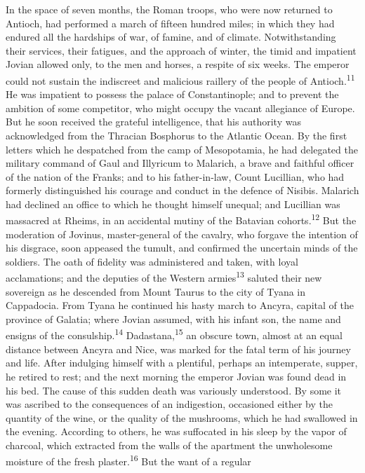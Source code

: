 {{{{{{{{{{In the space of seven months, the Roman troops, who were now
returned to Antioch, had performed a march of fifteen hundred
miles; in which they had endured all the hardships of war, of
famine, and of climate. Notwithstanding their services, their
fatigues, and the approach of winter, the timid and impatient
Jovian allowed only, to the men and horses, a respite of six
weeks. The emperor could not sustain the indiscreet and malicious
raillery of the people of Antioch.\textsuperscript{11} He was impatient to possess
the palace of Constantinople; and to prevent the ambition of some
competitor, who might occupy the vacant allegiance of Europe. But
he soon received the grateful intelligence, that his authority
was acknowledged from the Thracian Bosphorus to the Atlantic
Ocean. By the first letters which he despatched from the camp of
Mesopotamia, he had delegated the military command of Gaul and
Illyricum to Malarich, a brave and faithful officer of the nation
of the Franks; and to his father-in-law, Count Lucillian, who had
formerly distinguished his courage and conduct in the defence of
Nisibis. Malarich had declined an office to which he thought
himself unequal; and Lucillian was massacred at Rheims, in an
accidental mutiny of the Batavian cohorts.\textsuperscript{12} But the moderation
of Jovinus, master-general of the cavalry, who forgave the
intention of his disgrace, soon appeased the tumult, and
confirmed the uncertain minds of the soldiers. The oath of
fidelity was administered and taken, with loyal acclamations; and
the deputies of the Western armies\textsuperscript{13} saluted their new sovereign
as he descended from Mount Taurus to the city of Tyana in
Cappadocia. From Tyana he continued his hasty march to Ancyra,
capital of the province of Galatia; where Jovian assumed, with
his infant son, the name and ensigns of the consulship.\textsuperscript{14}
Dadastana,\textsuperscript{15} an obscure town, almost at an equal distance
between Ancyra and Nice, was marked for the fatal term of his
journey and life. After indulging himself with a plentiful,
perhaps an intemperate, supper, he retired to rest; and the next
morning the emperor Jovian was found dead in his bed. The cause
of this sudden death was variously understood. By some it was
ascribed to the consequences of an indigestion, occasioned either
by the quantity of the wine, or the quality of the mushrooms,
which he had swallowed in the evening. According to others, he
was suffocated in his sleep by the vapor of charcoal, which
extracted from the walls of the apartment the unwholesome
moisture of the fresh plaster.\textsuperscript{16} But the want of a regular
}}}}}}}}}}

